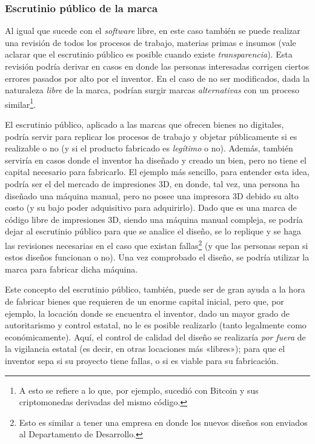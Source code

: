 \documentclass[12pt,a4paper]{article}
\begin{document}
\subsubsection{Escrutinio público de la marca}
Al igual que sucede con el \textit{software} libre, en este caso también se puede realizar una revisión de todos los procesos de trabajo, materias primas e insumos (vale aclarar que el escrutinio público es posible cuando existe \textit{transparencia}). Esta revisión podría derivar en casos en donde las personas interesadas corrigen ciertos errores pasados por alto por el inventor. En el caso de no ser modificados, dada la naturaleza \textit{libre} de la marca, podrían surgir marcas \textit{alternativas} con un proceso similar\footnote{A esto se refiere a lo que, por ejemplo, sucedió con Bitcoin y sus criptomonedas derivadas del mismo código.}.

El escrutinio público, aplicado a las marcas que ofrecen bienes no digitales, podría servir para replicar los procesos de trabajo y objetar públicamente si es realizable o no (y si el producto fabricado es \textit{legítimo} o no). Además, también serviría en casos donde el inventor ha diseñado y creado un bien, pero no tiene el capital necesario para fabricarlo. El ejemplo más sencillo, para entender esta idea, podría ser el del mercado de impresiones 3D, en donde, tal vez, una persona ha diseñado una máquina manual, pero no posee una impresora 3D debido su alto costo (y su bajo poder adquisitivo para adquirirlo). Dado que es una marca de código libre de impresiones 3D, siendo una máquina manual compleja, se podría dejar al escrutinio público para que se analice el diseño, se lo replique y se haga las revisiones necesarias en el caso que existan fallas\footnote{Esto es similar a tener una empresa en donde los nuevos diseños son enviados al Departamento de Desarrollo.} (y que las personas sepan si estos diseños funcionan o no). Una vez comprobado el diseño, se podría utilizar la marca para fabricar dicha máquina.

Este concepto del escrutinio público, también, puede ser de gran ayuda a la hora de fabricar bienes que requieren de un enorme capital inicial, pero que, por ejemplo, la locación donde se encuentra el inventor, dado un mayor grado de autoritarismo y control estatal, no le es posible realizarlo (tanto legalmente como económicamente). Aquí, el control de calidad del diseño se realizaría \textit{por fuera} de la vigilancia estatal (es decir, en otras locaciones más «libres»); para que el inventor sepa si su proyecto tiene fallas, o si es viable para su fabricación.
\end{document}
